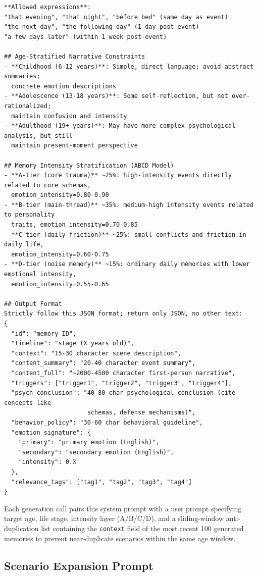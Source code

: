 \begin{tcolorbox}[
  breakable,
  colback=blue!5,
  colframe=blue!60!black,
  title={\textbf{Memory Generation System Prompt (Claude Sonnet 4.6)}},
  fonttitle=\bfseries,
  rounded corners,
  boxrule=1.0pt
]
\begin{Verbatim}[fontsize=\scriptsize, breaklines=true, breaksymbolleft={}, breaksymbolright={}, breakindent=1em]
**Allowed expressions**:
"that evening", "that night", "before bed" (same day as event)
"the next day", "the following day" (1 day post-event)
"a few days later" (within 1 week post-event)

## Age-Stratified Narrative Constraints
- **Childhood (6-12 years)**: Simple, direct language; avoid abstract summaries;
  concrete emotion descriptions
- **Adolescence (13-18 years)**: Some self-reflection, but not over-rationalized;
  maintain confusion and intensity
- **Adulthood (19+ years)**: May have more complex psychological analysis, but still
  maintain present-moment perspective

## Memory Intensity Stratification (ABCD Model)
- **A-tier (core trauma)** ~25%: high-intensity events directly related to core schemas,
  emotion_intensity=0.80-0.90
- **B-tier (main-thread)** ~35%: medium-high intensity events related to personality
  traits, emotion_intensity=0.70-0.85
- **C-tier (daily friction)** ~25%: small conflicts and friction in daily life,
  emotion_intensity=0.60-0.75
- **D-tier (noise memory)** ~15%: ordinary daily memories with lower emotional intensity,
  emotion_intensity=0.55-0.65

## Output Format
Strictly follow this JSON format; return only JSON, no other text:
{
  "id": "memory ID",
  "timeline": "stage (X years old)",
  "context": "15-30 character scene description",
  "content_summary": "20-40 character event summary",
  "content_full": "~2000-4500 character first-person narrative",
  "triggers": ["trigger1", "trigger2", "trigger3", "trigger4"],
  "psych_conclusion": "40-80 char psychological conclusion (cite concepts like
                       schemas, defense mechanisms)",
  "behavior_policy": "30-60 char behavioral guideline",
  "emotion_signature": {
    "primary": "primary emotion (English)",
    "secondary": "secondary emotion (English)",
    "intensity": 0.X
  },
  "relevance_tags": ["tag1", "tag2", "tag3", "tag4"]
}
\end{Verbatim}
\end{tcolorbox}

Each generation call pairs this system prompt with a user prompt specifying target age, life stage, intensity layer (A/B/C/D), and a sliding-window anti-duplication list containing the \texttt{context} field of the most recent 100 generated memories to prevent near-duplicate scenarios within the same age window.

\subsection{Scenario Expansion Prompt}
\label{app:prompt_scenario}

